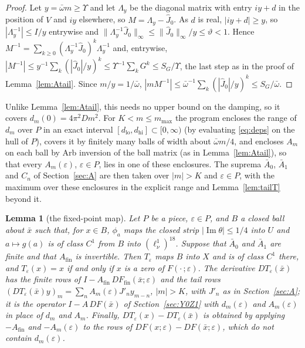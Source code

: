 \documentclass[11pt]{article}
\newtheorem{lemma}{Lemma}[section]
\theoremstyle{definition}
\newcommand{\im}{\operatorname{Im}}
\begin{document}
\begin{proof}
Let $y = \bar\omega m \ge \Upsilon$ and let $\Lambda_y$ be the diagonal matrix with entry $iy + d$ in the position of $V$ and $iy$ elsewhere, so $M = \Lambda_y - \hat J_0$. As $d$ is real, $|iy + d| \ge y$, so $|\Lambda_y^{-1}| \le I/y$ entrywise and $\|\Lambda_y^{-1}\hat J_0\|_\infty \le \|\hat J_0\|_\infty/y \le \vartheta < 1$. Hence $M^{-1} = \sum_{k\ge0}(\Lambda_y^{-1}\hat J_0)^k\Lambda_y^{-1}$ and, entrywise, $|M^{-1}| \le y^{-1}\sum_k(|\hat J_0|/y)^k \le \Upsilon^{-1}\sum_kG^k \le S_G/\Upsilon$, the last step as in the proof of Lemma~\ref{lem:Atail}. Since $m/y = 1/\bar\omega$, $|mM^{-1}| \le \bar\omega^{-1}\sum_k(|\hat J_0|/y)^k \le S_G/\bar\omega$.
\end{proof}

Unlike Lemma~\ref{lem:Atail}, this needs no upper bound on the damping, so it covers $d_m(0) = 4\pi^2Dm^2$. For $K < m \le m_{\max}$ the program encloses the range of $d_m$ over $P$ in an exact interval $[d_{\mathrm{lo}}, d_{\mathrm{hi}}] \subset [0, \infty)$ (by evaluating \eqref{eq:deps} on the hull of $P$), covers it by finitely many balls of width about $\bar\omega m/4$, and encloses $A_m$ on each ball by Arb inversion of the ball matrix (as in Lemma~\ref{lem:Atail}), so that every $A_m(\varepsilon)$, $\varepsilon \in P$, lies in one of these enclosures. The suprema $\bar A_0$, $\bar A_1$ and $C_n$ of Section~\ref{sec:A} are then taken over $|m| > K$ and $\varepsilon \in P$, with the maximum over these enclosures in the explicit range and Lemma~\ref{lem:tailT} beyond it.

\begin{lemma}[the fixed-point map]\label{lem:Teps}
Let $P$ be a piece, $\varepsilon \in P$, and $B$ a closed ball about $\bar x$ such that, for $x \in B$, $\phi_a$ maps the closed strip $|\im\theta| \le 1/4$ into $U$ and $a \mapsto g(a)$ is of class $C^1$ from $B$ into $(\ell^1_\nu)^{18}$. Suppose that $\bar A_0$ and $\bar A_1$ are finite and that $A_{\mathrm{fin}}$ is invertible. Then $T_\varepsilon$ maps $B$ into $X$ and is of class $C^1$ there, and $T_\varepsilon(x) = x$ if and only if $x$ is a zero of $F(\cdot\,;\varepsilon)$. The derivative $DT_\varepsilon(\bar x)$ has the finite rows of $I - A_{\mathrm{fin}}\,DF_{\mathrm{fin}}(\bar x;\varepsilon)$ and the tail rows $(DT_\varepsilon(\bar x)y)_m = \sum_nA_m(\varepsilon)J'_ny_{m-n}$, $|m| > K$, with $J'_n$ as in Section~\ref{sec:A}; it is the operator $I - A\,DF(\bar x)$ of Section~\ref{sec:Y0Z1} with $d_m(\varepsilon)$ and $A_m(\varepsilon)$ in place of $d_m$ and $A_m$. Finally, $DT_\varepsilon(x) - DT_\varepsilon(\bar x)$ is obtained by applying $-A_{\mathrm{fin}}$ and $-A_m(\varepsilon)$ to the rows of $DF(x;\varepsilon) - DF(\bar x;\varepsilon)$, which do not contain $d_m(\varepsilon)$.
\end{lemma}
\end{document}
